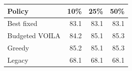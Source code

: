 \begin{tabular}{lrrr}
\toprule
Policy & 10\% & 25\% & 50\% \\
\midrule
Best fixed & 83.1 & 83.1 & 83.1 \\
Budgeted VOILA & 84.2 & 85.1 & 85.3 \\
Greedy & 85.2 & 85.1 & 85.3 \\
Legacy & 68.1 & 68.1 & 68.1 \\
\bottomrule
\end{tabular}
